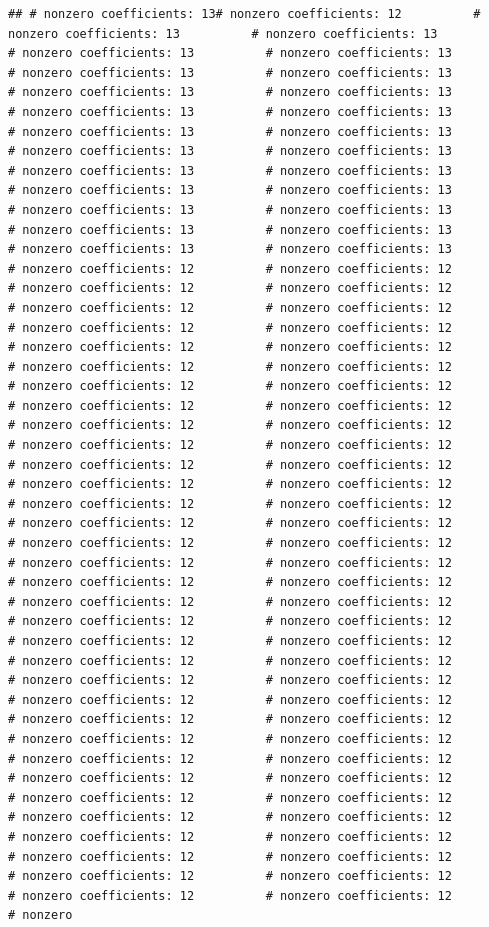 \documentclass[
]{article}
\begin{document}
\begin{verbatim}
## # nonzero coefficients: 13# nonzero coefficients: 12          # nonzero coefficients: 13          # nonzero coefficients: 13          # nonzero coefficients: 13          # nonzero coefficients: 13          # nonzero coefficients: 13          # nonzero coefficients: 13          # nonzero coefficients: 13          # nonzero coefficients: 13          # nonzero coefficients: 13          # nonzero coefficients: 13          # nonzero coefficients: 13          # nonzero coefficients: 13          # nonzero coefficients: 13          # nonzero coefficients: 13          # nonzero coefficients: 13          # nonzero coefficients: 13          # nonzero coefficients: 13          # nonzero coefficients: 13          # nonzero coefficients: 13          # nonzero coefficients: 13          # nonzero coefficients: 13          # nonzero coefficients: 13          # nonzero coefficients: 13          # nonzero coefficients: 13          # nonzero coefficients: 12          # nonzero coefficients: 12          # nonzero coefficients: 12          # nonzero coefficients: 12          # nonzero coefficients: 12          # nonzero coefficients: 12          # nonzero coefficients: 12          # nonzero coefficients: 12          # nonzero coefficients: 12          # nonzero coefficients: 12          # nonzero coefficients: 12          # nonzero coefficients: 12          # nonzero coefficients: 12          # nonzero coefficients: 12          # nonzero coefficients: 12          # nonzero coefficients: 12          # nonzero coefficients: 12          # nonzero coefficients: 12          # nonzero coefficients: 12          # nonzero coefficients: 12          # nonzero coefficients: 12          # nonzero coefficients: 12          # nonzero coefficients: 12          # nonzero coefficients: 12          # nonzero coefficients: 12          # nonzero coefficients: 12          # nonzero coefficients: 12          # nonzero coefficients: 12          # nonzero coefficients: 12          # nonzero coefficients: 12          # nonzero coefficients: 12          # nonzero coefficients: 12          # nonzero coefficients: 12          # nonzero coefficients: 12          # nonzero coefficients: 12          # nonzero coefficients: 12          # nonzero coefficients: 12          # nonzero coefficients: 12          # nonzero coefficients: 12          # nonzero coefficients: 12          # nonzero coefficients: 12          # nonzero coefficients: 12          # nonzero coefficients: 12          # nonzero coefficients: 12          # nonzero coefficients: 12          # nonzero coefficients: 12          # nonzero coefficients: 12          # nonzero coefficients: 12          # nonzero coefficients: 12          # nonzero coefficients: 12          # nonzero coefficients: 12          # nonzero coefficients: 12          # nonzero coefficients: 12          # nonzero coefficients: 12          # nonzero coefficients: 12          # nonzero coefficients: 12          # nonzero coefficients: 12          # nonzero coefficients: 12          # nonzero coefficients: 12          # nonzero coefficients: 12          # nonzero coefficients: 12          # nonzero coefficients: 12          # nonzero coefficients: 12          # nonzero coefficients: 12          # nonzero coefficients: 12          # nonzero coefficients: 12          # nonzero 
\end{verbatim}
\end{document}
